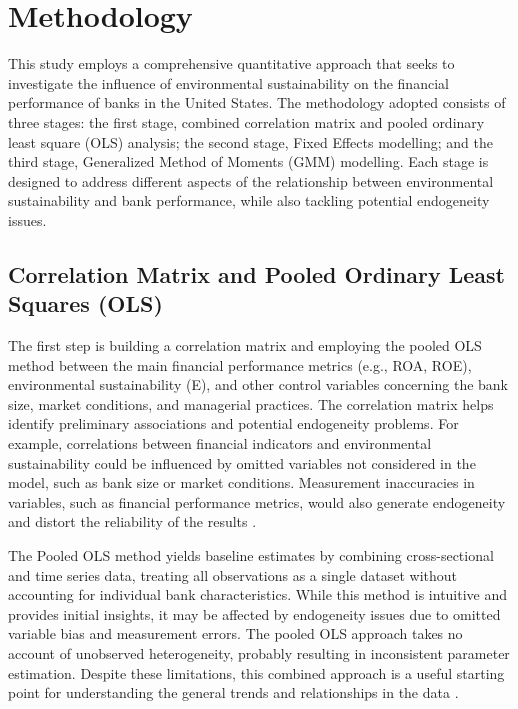 \documentclass[11pt, a4paper]{article}
\begin{document}
\newpage
\section{Methodology}
This study employs a comprehensive quantitative approach that seeks to investigate the influence of environmental sustainability on the financial performance of banks in the United States. The methodology adopted consists of three stages: the first stage, combined correlation matrix and pooled ordinary least square (OLS) analysis; the second stage, Fixed Effects modelling; and the third stage, Generalized Method of Moments (GMM) modelling. Each stage is designed to address different aspects of the relationship between environmental sustainability and bank performance, while also tackling potential endogeneity issues.

\subsection{Correlation Matrix and Pooled Ordinary Least Squares (OLS)}
The first step is building a correlation matrix and employing the pooled OLS method between the main financial performance metrics (e.g., ROA, ROE), environmental sustainability (E), and other control variables concerning the bank size, market conditions, and managerial practices. The correlation matrix helps identify preliminary associations and potential endogeneity problems. For example, correlations between financial indicators and environmental sustainability could be influenced by omitted variables not considered in the model, such as bank size or market conditions. Measurement inaccuracies in variables, such as financial performance metrics, would also generate endogeneity and distort the reliability of the results \citep{Tumminello2010}. 

The Pooled OLS method yields baseline estimates by combining cross-sectional and time series data, treating all observations as a single dataset without accounting for individual bank characteristics. While this method is intuitive and provides initial insights, it may be affected by endogeneity issues due to omitted variable bias and measurement errors. The pooled OLS approach takes no account of unobserved heterogeneity, probably resulting in inconsistent parameter estimation. Despite these limitations, this combined approach is a useful starting point for understanding the general trends and relationships in the data \citep{Adekeye2021}.
\end{document}
